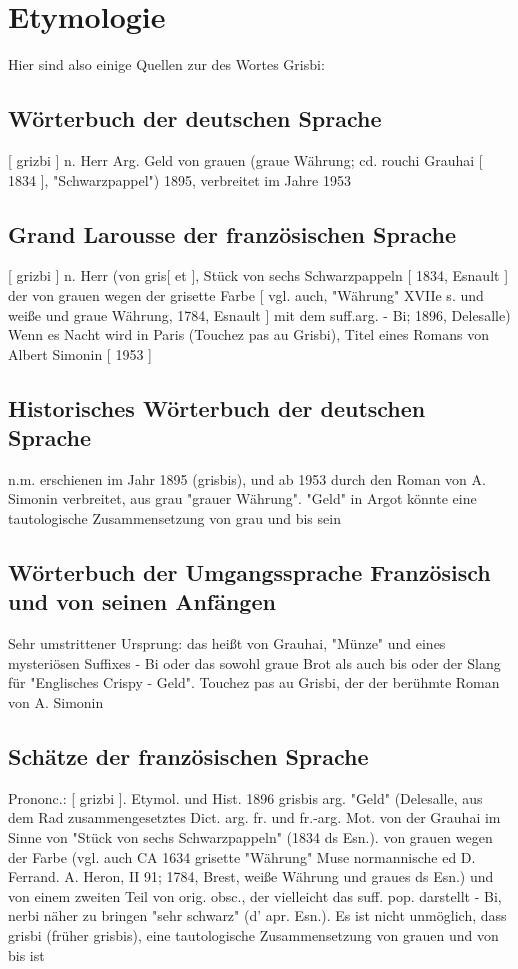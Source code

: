 \section{Etymologie\label{preamble-etymology}}

Hier sind also einige Quellen zur  des Wortes Grisbi:



\subsection*{Wörterbuch der deutschen Sprache}
[ grizbi ] n. Herr Arg. Geld von grauen (graue Währung; cd. rouchi Grauhai [ 1834 ], "Schwarzpappel") 1895, verbreitet im Jahre 1953

\subsection*{Grand Larousse der französischen Sprache}
[ grizbi ] n. Herr (von gris[ et ], Stück von sechs Schwarzpappeln [ 1834, Esnault ] der von grauen wegen der grisette Farbe [ vgl. auch, "Währung" XVIIe s. und weiße und graue Währung, 1784, Esnault ] mit dem suff.arg. - Bi; 1896, Delesalle)
Wenn es Nacht wird in Paris (Touchez pas au Grisbi), Titel eines Romans von Albert Simonin [ 1953 ]

\subsection*{Historisches Wörterbuch der deutschen Sprache}
n.m. erschienen im Jahr 1895 (grisbis), und ab 1953 durch den Roman von A. Simonin verbreitet, aus grau "grauer Währung". "Geld" in Argot könnte eine tautologische Zusammensetzung von grau und bis sein

\subsection*{Wörterbuch der Umgangssprache Französisch und von seinen Anfängen}
Sehr umstrittener Ursprung: das heißt von Grauhai, "Münze" und eines mysteriösen Suffixes - Bi oder das sowohl graue Brot als auch bis oder der Slang für "Englisches Crispy - Geld". Touchez pas au Grisbi, der der berühmte Roman von A. Simonin

\subsection*{Schätze der französischen Sprache}
Prononc.: [ grizbi ]. Etymol. und Hist. 1896 grisbis arg. "Geld" (Delesalle, aus dem Rad zusammengesetztes Dict. arg. fr. und fr.-arg. Mot. von der Grauhai im Sinne von "Stück von sechs Schwarzpappeln" (1834 ds Esn.). von grauen wegen der Farbe (vgl. auch CA 1634 grisette "Währung" Muse normannische ed D. Ferrand. A. Heron, II 91; 1784, Brest, weiße Währung und graues ds Esn.) und von einem zweiten Teil von orig. obsc., der vielleicht das suff. pop. darstellt - Bi, nerbi näher zu bringen "sehr schwarz" (d' apr. Esn.). Es ist nicht unmöglich, dass grisbi (früher grisbis), eine tautologische Zusammensetzung von grauen und von bis ist

